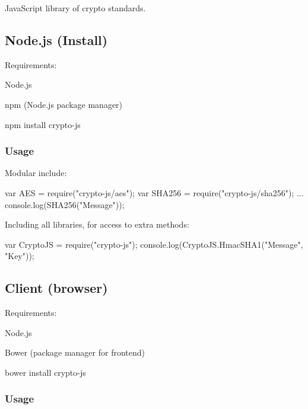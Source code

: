 Java\+Script library of crypto standards.

\subsection*{Node.\+js (Install)}

Requirements\+:


\begin{DoxyItemize}
\item Node.\+js
\item npm (Node.\+js package manager)
\end{DoxyItemize}


\begin{DoxyCode}
npm install crypto-js
\end{DoxyCode}


\subsubsection*{Usage}

Modular include\+:


\begin{DoxyCode}
var AES = require("crypto-js/aes");
var SHA256 = require("crypto-js/sha256");
...
console.log(SHA256("Message"));
\end{DoxyCode}


Including all libraries, for access to extra methods\+:


\begin{DoxyCode}
var CryptoJS = require("crypto-js");
console.log(CryptoJS.HmacSHA1("Message", "Key"));
\end{DoxyCode}


\subsection*{Client (browser)}

Requirements\+:


\begin{DoxyItemize}
\item Node.\+js
\item Bower (package manager for frontend)
\end{DoxyItemize}


\begin{DoxyCode}
bower install crypto-js
\end{DoxyCode}


\subsubsection*{Usage}

